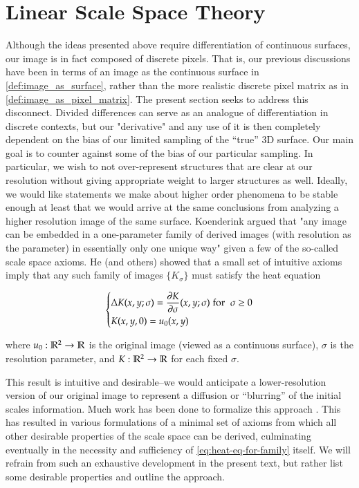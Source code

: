 \chapter{Linear Scale Space Theory} \label{sec:scale-space-theory}
    
    Although the ideas presented above require differentiation of continuous
    surfaces, our image is in fact composed of discrete pixels. That is, our previous discussions have been in terms of an image as the continuous surface in \cref{def:image_as_surface},
    rather than the more realistic discrete pixel matrix as in \cref{def:image_as_pixel_matrix}.
    The present section seeks to address this disconnect. Divided differences can serve as an analogue of differentiation in discrete contexts, but our "derivative" and any use of it is then completely dependent on the bias of our limited sampling of the ``true'' 3D surface. Our main goal is to counter against some of the bias of our particular sampling. In particular, we wish to not over-represent structures that are clear at our resolution without giving appropriate weight to larger structures as well. Ideally, we would like statements we make about higher order phenomena to be stable enough at least that we would arrive at the same conclusions from analyzing a higher resolution image of the same surface.
    Koenderink \cite{Koenderink} argued that "any image can be embedded in a one-parameter family of derived images (with resolution as the parameter) in essentially only one unique way" given a few of the so-called scale space axioms. He (and others) showed that a small set of intuitive axioms imply that any such family of images $\{K_\sigma\}$ must satisfy the heat equation
    
    \begin{equation} \label{eq:heat-eq-for-family}
    \begin{dcases}
    \Delta K(x,y;\sigma) = \frac{\partial K}{\partial \sigma}(x,y;\sigma)
    \;\text{for}\;\; \sigma \ge 0  \\
    K(x,y, 0) = u_0(x,y)
    \end{dcases}
    \end{equation}
    
    where $u_0: \mathbb{R}^2 \to \mathbb{R}$ is the original image (viewed as a continuous surface), $\sigma$ is the resolution parameter, and $K: \mathbb{R}^2 \to \mathbb{R} $ for each fixed $\sigma$.
    
    
    This result is intuitive and desirable--we would anticipate a lower-resolution version of our original image to represent a diffusion or ``blurring'' of the initial scales information. Much work has been done to formalize this approach \cite{GSST-book}. This has resulted in various formulations of a minimal set of axioms from which all other desirable properties of the scale space can be derived, culminating eventually in the necessity and sufficiency of \cref{eq:heat-eq-for-family} itself. We will refrain from such an exhaustive development in the present text, but rather list some desirable properties and outline the approach.
	    
